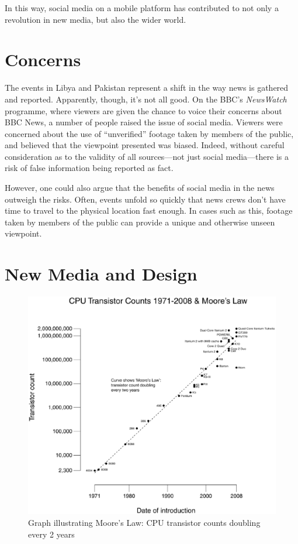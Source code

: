 \documentclass[a4paper,11pt]{article}
\begin{document}
    In this way, social media on a mobile platform has contributed to not only
    a revolution in new media, but also the wider world.

    \section{Concerns}

    The events in Libya and Pakistan represent a shift in the way news is
    gathered and reported.  Apparently, though, it's not all good. On the BBC's
    \emph{NewsWatch} programme, where viewers are given the chance to voice
    their concerns about BBC News, a number of people raised the issue of
    social media. Viewers were concerned about the use of ``unverified''
    footage taken by members of the public, and believed that the viewpoint
    presented was biased. Indeed, without careful consideration as to the
    validity of all sources---not just social media---there is a risk of false
    information being reported as fact.

    However, one could also argue that the benefits of social media in the news
    outweigh the risks. Often, events unfold so quickly that news crews don't
    have time to travel to the physical location fast enough. In cases such as
    this, footage taken by members of the public can provide a unique and
    otherwise unseen viewpoint.

    \section{New Media and Design}

    \begin{figure}[ht]
        \begin{center}
            \includegraphics[width=\textwidth]{moores-law}
        \end{center}
        \caption{Graph illustrating Moore's Law: CPU transistor counts doubling
        every 2 years}
        \label{fig:moores-law}
    \end{figure}
\end{document}
